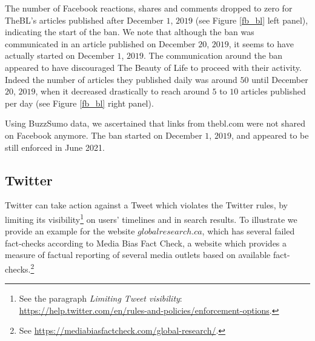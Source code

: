 \documentclass{article}
\begin{document}
The number of Facebook reactions, shares and comments dropped to zero for TheBL’s articles published after December $1$, $2019$ (see Figure \ref{fb_bl} left panel), indicating the start of the ban. We note that although the ban was communicated in an article published on December $20$, $2019$, it seems to have actually started on December $1$, $2019$. The communication around the ban appeared to have discouraged The Beauty of Life to proceed with their activity. Indeed the number of articles they published daily was around $50$ until December $20$, $2019$, when it decreased drastically to reach around $5$ to $10$ articles published per day (see Figure \ref{fb_bl} right panel). 

Using BuzzSumo data, we ascertained that links from thebl.com were not shared on Facebook anymore. The ban started on December $1$, $2019$, and appeared to be still enforced in June 2021.

\subsection{Twitter}  \label{globalresearch}

Twitter can take action against a Tweet which violates the Twitter rules, by limiting its visibility\footnote{See the paragraph {\it Limiting Tweet visibility}: \href{https://help.twitter.com/en/rules-and-policies/enforcement-options}{https://help.twitter.com/en/rules-and-policies/enforcement-options}.} on users' timelines and in search results. To illustrate we provide an example for the website $globalresearch.ca$, which has several failed fact-checks according to Media Bias Fact Check, a website which provides a measure of factual reporting of several media outlets based on available fact-checks.\footnote{See \href{https://mediabiasfactcheck.com/global-research/}{https://mediabiasfactcheck.com/global-research/}.}
\end{document}
